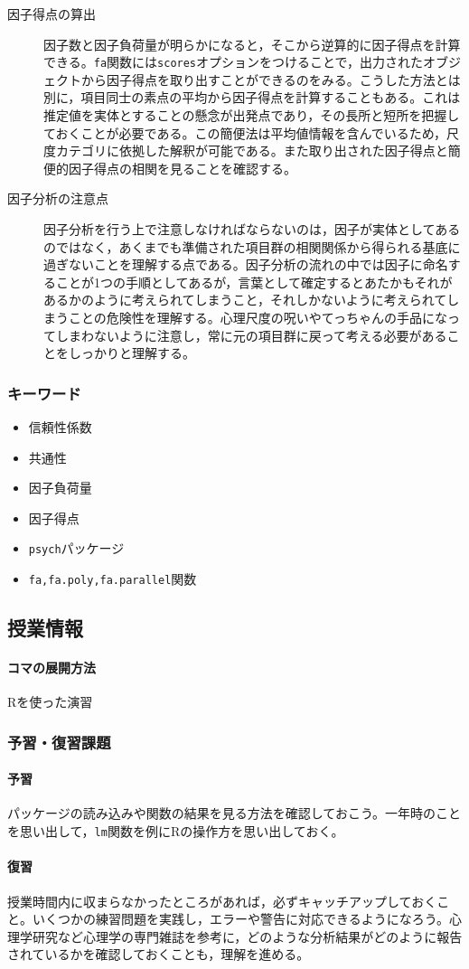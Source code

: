 \begin{description}
	\item[因子得点の算出] 因子数と因子負荷量が明らかになると，そこから逆算的に因子得点を計算できる。\texttt{fa}関数には\texttt{scores}オプションをつけることで，出力されたオブジェクトから因子得点を取り出すことができるのをみる。こうした方法とは別に，項目同士の素点の平均から因子得点を計算することもある。これは推定値を実体とすることの懸念が出発点であり，その長所と短所を把握しておくことが必要である。この簡便法は平均値情報を含んでいるため，尺度カテゴリに依拠した解釈が可能である。また取り出された因子得点と簡便的因子得点の相関を見ることを確認する。
	\item[因子分析の注意点] 因子分析を行う上で注意しなければならないのは，因子が実体としてあるのではなく，あくまでも準備された項目群の相関関係から得られる基底に過ぎないことを理解する点である。因子分析の流れの中では因子に命名することが1つの手順としてあるが，言葉として確定するとあたかもそれがあるかのように考えられてしまうこと，それしかないように考えられてしまうことの危険性を理解する。心理尺度の呪いやてっちゃんの手品になってしまわないように注意し，常に元の項目群に戻って考える必要があることをしっかりと理解する。

\end{description}
\subsubsection{キーワード}
\begin{itemize}
	\item 信頼性係数
	\item 共通性
	\item 因子負荷量
	\item 因子得点
	\item \texttt{psych}パッケージ
	\item \texttt{fa,fa.poly,fa.parallel}関数
\end{itemize}
\subsection{授業情報}
\paragraph{コマの展開方法}
Rを使った演習
\subsubsection{予習・復習課題}
\paragraph{予習}パッケージの読み込みや関数の結果を見る方法を確認しておこう。一年時のことを思い出して，\texttt{lm}関数を例にRの操作方を思い出しておく。
\paragraph{復習}授業時間内に収まらなかったところがあれば，必ずキャッチアップしておくこと。いくつかの練習問題を実践し，エラーや警告に対応できるようになろう。心理学研究など心理学の専門雑誌を参考に，どのような分析結果がどのように報告されているかを確認しておくことも，理解を進める。